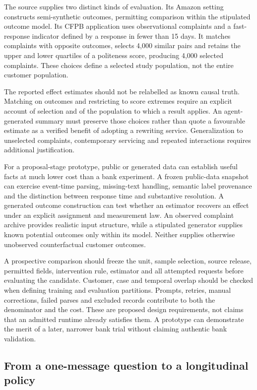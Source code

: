 The source supplies two distinct kinds of evaluation. Its Amazon setting constructs semi-synthetic outcomes, permitting comparison within the stipulated outcome model. Its CFPB application uses observational complaints and a fast-response indicator defined by a response in fewer than 15 days. It matches complaints with opposite outcomes, selects 4,000 similar pairs and retains the upper and lower quartiles of a politeness score, producing 4,000 selected complaints. These choices define a selected study population, not the entire customer population.~\citep{exec28_lm_pryzant}

The reported effect estimates should not be relabelled as known causal truth. Matching on outcomes and restricting to score extremes require an explicit account of selection and of the population to which a result applies. An agent-generated summary must preserve those choices rather than quote a favourable estimate as a verified benefit of adopting a rewriting service. Generalization to unselected complaints, contemporary servicing and repeated interactions requires additional justification.

For a proposal-stage prototype, public or generated data can establish useful facts at much lower cost than a bank experiment. A frozen public-data snapshot can exercise event-time parsing, missing-text handling, semantic label provenance and the distinction between response time and substantive resolution. A generated outcome construction can test whether an estimator recovers an effect under an explicit assignment and measurement law. An observed complaint archive provides realistic input structure, while a stipulated generator supplies known potential outcomes only within its model. Neither supplies otherwise unobserved counterfactual customer outcomes.

A prospective comparison should freeze the unit, sample selection, source release, permitted fields, intervention rule, estimator and all attempted requests before evaluating the candidate. Customer, case and temporal overlap should be checked when defining training and evaluation partitions. Prompts, retries, manual corrections, failed parses and excluded records contribute to both the denominator and the cost. These are proposed design requirements, not claims that an admitted runtime already satisfies them. A prototype can demonstrate the merit of a later, narrower bank trial without claiming authentic bank validation.

\subsection{From a one-message question to a longitudinal policy}

